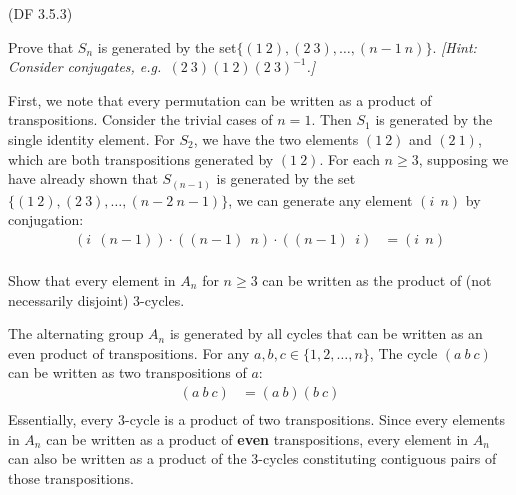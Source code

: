 \begin{problem}{(\textsf{DF 3.5.3})}
  \begin{enumalph}
    \item Prove that $S_n$ is generated by the set$\{(1\ 2),(2\ 3),\dots,(n-1\ n)\}$. 
      \emph{[Hint: Consider conjugates, e.g.\ ${(2\ 3)(1\ 2)(2\ 3)}^{-1}$.]}
      \begin{Answer}
        First, we note that every permutation can be written
        as a product of transpositions.
        Consider the trivial cases of $n = 1$. Then $S_1$ is generated by the single
        identity element.
        For $S_2$, we have the two elements $(1\ 2)$ and $(2\ 1)$, which
        are both transpositions generated by $(1\ 2)$.
        For each $n \geq 3$, supposing we have already shown that $S_{(n-1)}$ is
        generated by the set $\{(1\ 2),(2\ 3),\dots,(n-2\ n-1)\}$, we can
        generate any element $(i\ \ n)$ by conjugation:
        \begin{align*}
          (i\ \ (n-1)) \cdot ((n-1)\ \ n) \cdot ((n-1) \ \ i) &= (i\ \ n) \\
        \end{align*}
      \end{Answer}
    \item Show that every element in $A_n$ for $n \geq 3$
      can be written as the product of (not necessarily disjoint) $3$-cycles.
      \begin{Answer}
        The alternating group $A_n$ is generated by all cycles that can be written
        as an even product of transpositions.
        For any $a, b, c \in \{1, 2, \dots, n\}$,
        The cycle $(a\ b\ c)$ can be written as two transpositions of $a$:
        \begin{align*}
          (a\ b\ c) &= (a\ b)(b\ c) \\
        \end{align*}
        Essentially, every $3$-cycle is a product of two transpositions.
        Since every elements in $A_n$ can be written as a product of \textbf{even}
        transpositions, every element in $A_n$ can also
        be written as a product of the $3$-cycles constituting contiguous pairs of
        those transpositions.
      \end{Answer}
  \end{enumalph}
\end{problem}
